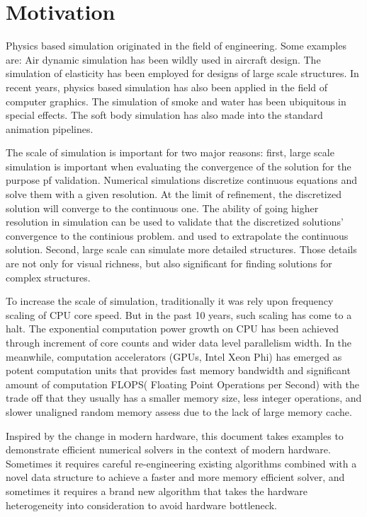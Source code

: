 \section{Motivation}

Physics based simulation originated in the field of engineering. Some examples are: Air dynamic simulation has been wildly used in aircraft design. The simulation of elasticity has been employed for designs of large scale structures. In recent years, physics based simulation has also been applied in the field of computer graphics. The simulation of smoke and water has been ubiquitous in special effects. The soft body simulation has also made into the standard animation pipelines.

The scale of simulation is important for two major reasons: first, large scale simulation is important when evaluating the convergence of the solution for the purpose pf validation. Numerical simulations discretize continuous equations and solve them with a given resolution. At the limit of refinement, the discretized solution will converge to the continuous one. The ability of going higher resolution in simulation can be used to validate that the discretized solutions' convergence to the continious problem. and used to extrapolate the continuous solution. Second, large scale can simulate more detailed structures. Those details are not only for visual richness, but also significant for finding solutions for complex structures.

To increase the scale of simulation, traditionally it was rely upon frequency scaling of CPU core speed. But in the past 10 years, such scaling has come to a halt. The exponential computation power growth on CPU has been achieved through increment of core counts and wider data level parallelism width. In the meanwhile, computation accelerators (GPUs, Intel Xeon Phi) has emerged as potent computation units that provides fast memory bandwidth and significant amount of computation FLOPS( Floating Point Operations per Second) with the trade off that they usually has a smaller memory size, less integer operations, and slower unaligned random memory assess due to the lack of large memory cache.

Inspired by the change in modern hardware, this document takes examples to demonstrate efficient numerical solvers in the context of modern hardware. Sometimes it requires careful re-engineering existing algorithms combined with a novel data structure to achieve a faster and more memory efficient solver, and sometimes it requires a brand new algorithm that takes the hardware heterogeneity into consideration to avoid hardware bottleneck.

